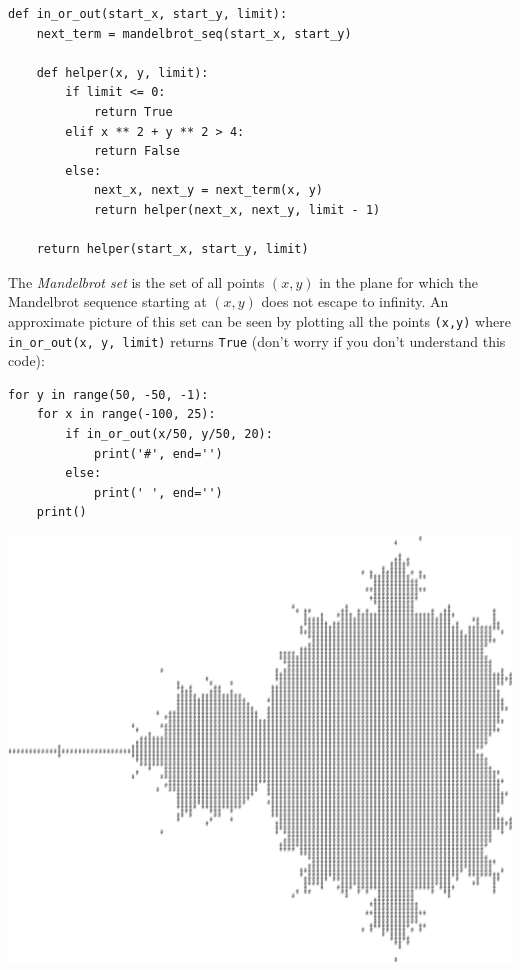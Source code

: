 \begin{solution}
\begin{lstlisting}
def in_or_out(start_x, start_y, limit):
    next_term = mandelbrot_seq(start_x, start_y)

    def helper(x, y, limit):
        if limit <= 0:
            return True
        elif x ** 2 + y ** 2 > 4: 
            return False
        else: 
            next_x, next_y = next_term(x, y)
            return helper(next_x, next_y, limit - 1)
            
    return helper(start_x, start_y, limit)
\end{lstlisting}
The \textit{Mandelbrot set} is the set of all points $(x, y)$ in the plane for which the Mandelbrot sequence starting at $(x, y)$ does not escape to infinity. An approximate picture of this set can be seen by plotting all the points \lstinline{(x,y)} where \lstinline{in_or_out(x, y, limit)} returns \lstinline{True} (don't worry if you don't understand this code): 
\begin{lstlisting}
for y in range(50, -50, -1):      
    for x in range(-100, 25):
        if in_or_out(x/50, y/50, 20):
            print('#', end='')
        else: 
            print(' ', end='')
    print()
\end{lstlisting}
\includegraphics[width=.75\textwidth]{mandelbrot.png}
\end{solution}